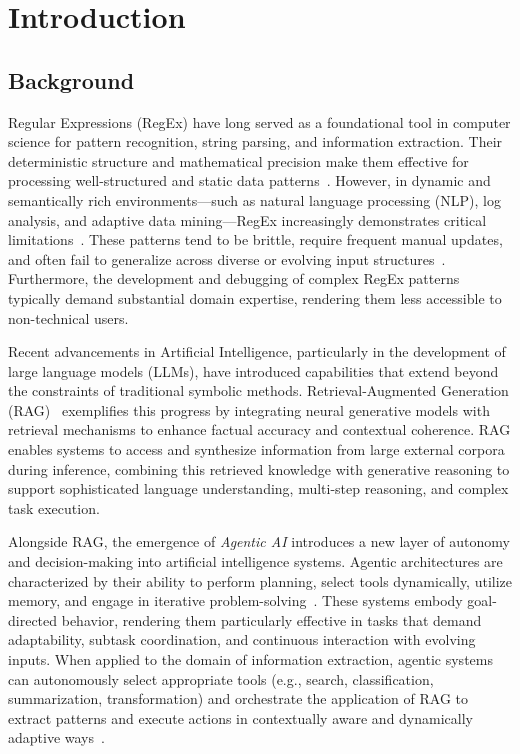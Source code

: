 \chapter{Introduction}
\section{Background}

Regular Expressions (RegEx) have long served as a foundational tool in computer science for pattern recognition, string parsing, and information extraction. Their deterministic structure and mathematical precision make them effective for processing well-structured and static data patterns~\cite{friedl2006mastering}. However, in dynamic and semantically rich environments—such as natural language processing (NLP), log analysis, and adaptive data mining—RegEx increasingly demonstrates critical limitations~\cite{chiticariu2010systemt, cox2010regex}. These patterns tend to be brittle, require frequent manual updates, and often fail to generalize across diverse or evolving input structures~\cite{locascio2016neural, li2020neural}. Furthermore, the development and debugging of complex RegEx patterns typically demand substantial domain expertise, rendering them less accessible to non-technical users.

\vspace{0.5cm}

Recent advancements in Artificial Intelligence, particularly in the development of large language models (LLMs), have introduced capabilities that extend beyond the constraints of traditional symbolic methods. Retrieval-Augmented Generation (RAG)~\cite{lewis2020retrieval} exemplifies this progress by integrating neural generative models with retrieval mechanisms to enhance factual accuracy and contextual coherence. RAG enables systems to access and synthesize information from large external corpora during inference, combining this retrieved knowledge with generative reasoning to support sophisticated language understanding, multi-step reasoning, and complex task execution.

\vspace{0.5cm}

Alongside RAG, the emergence of \textit{Agentic AI} introduces a new layer of autonomy and decision-making into artificial intelligence systems. Agentic architectures are characterized by their ability to perform planning, select tools dynamically, utilize memory, and engage in iterative problem-solving~\cite{yao2022react, shinn2023reflexion, ferrag2025can}. These systems embody goal-directed behavior, rendering them particularly effective in tasks that demand adaptability, subtask coordination, and continuous interaction with evolving inputs. When applied to the domain of information extraction, agentic systems can autonomously select appropriate tools (e.g., search, classification, summarization, transformation) and orchestrate the application of RAG to extract patterns and execute actions in contextually aware and dynamically adaptive ways~\cite{wu2024agenttuning}.


